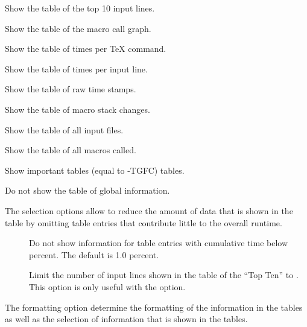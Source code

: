 \documentclass[a4paper,english]{article}
\begin{document}
\begin{Description}
\item[\Opt{-T}]
  Show the table of the top 10 input lines.
\item[\Opt{-G}]
  Show the table of the  macro call graph.
\item[\Opt{-C}]    Show the table of times per TeX command.
\item[\Opt{-L}]    Show the table of times per input line.
\item[\Opt{-R}]    Show the table of raw time stamps.
\item[\Opt{-S}]    Show the table of macro stack changes.
\item[\Opt{-F}]    Show the table of all input files.
\item[\Opt{-M}]    Show the table of all macros called.
\item[\Opt{-A}]    Show important tables (equal to -TGFC) tables.
\item[\Opt{-N}]    Do not show the table of global information.
\end{Description}

The selection options allow to reduce the amount of data that is shown
in the table by omitting table entries that contribute little to the
overall runtime.

\begin{description}
\item[] Do not show information for table entries
  with cumulative time below  percent. The default is 1.0 percent.
\item[] Limit the number of input lines shown in the
  table of the ``Top Ten'' to . This option is only useful
  with the  option.
\end{description}

The formatting option determine the formatting of the information in the tables
as well as the selection of information that is shown in the tables.
\end{document}
